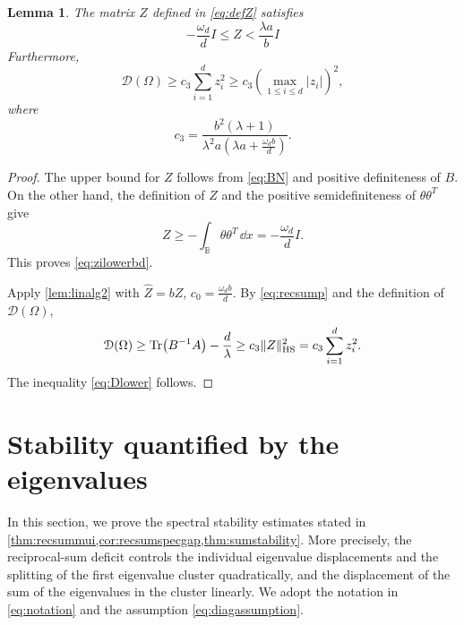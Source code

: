 \documentclass{amsart}
\numberwithin{equation}{section}
\theoremstyle{plain}
\newtheorem{lemma}[theorem]{Lemma}
\theoremstyle{definition}
\theoremstyle{plain}
\theoremstyle{remark}
\numberwithin{figure}{section}
\newcommand{\B}{\mathbb{B}}
\newcommand{\D}{\mathcal{D}(\Omega)}
\begin{document}
\begin{lemma}
    \label{lem:tech}
    The matrix $Z$ defined in \cref{eq:defZ} satisfies
    \begin{equation}
        \label{eq:zilowerbd}
        -\frac{\omega_d}{d}I\leq Z< \frac{\lambda a}{b}I
    \end{equation}
    Furthermore, 
    \begin{equation}
        \label{eq:Dlower}
        \D \geq c_3 \sum_{i=1}^d z_i^2 \geq c_3(\max_{1\leq i\leq d}|z_i|)^2, 
    \end{equation}
    where
    \begin{equation}
        \label{eq:C1}
        c_3=\frac{b^2(\lambda+1)}{\lambda^2 a\left(\lambda a+\frac{\omega_d b}{d}\right)}.
    \end{equation}
\end{lemma}

\begin{proof}
    The upper bound for $Z$ follows from \cref{eq:BN} and positive definiteness of $B$. On the other hand, the definition of $Z$ and the positive semidefiniteness of $\theta\theta^T$ give
    \begin{equation*}
        Z\geq -\int_{\B}\theta\theta^T\,\dd x = -\frac{\omega_d}{d}I.
    \end{equation*}
    This proves \cref{eq:zilowerbd}. 
    
    Apply \cref{lem:linalg2} with $\widehat{Z}=bZ$, $c_0=\frac{\omega_db}{d}$. By \cref{eq:recsump} and the definition of $\D$,
    \[
        \D \geq \Tr(B^{-1}A)-\frac{d}{\lambda} \geq c_3\|Z\|_{\mathrm{HS}}^2 = c_3\sum_{i=1}^d z_i^2.
    \] 
The inequality    \cref{eq:Dlower} follows.
\end{proof}




\section{Stability quantified by the eigenvalues}

In this section, we prove the spectral stability estimates stated in \cref{thm:recsummui,cor:recsumspecgap,thm:sumstability}. More precisely, the reciprocal-sum deficit controls the individual eigenvalue displacements and the splitting of the first eigenvalue cluster quadratically, and the displacement of the sum of the eigenvalues in the cluster linearly. We adopt the notation in \cref{eq:notation} and the assumption \cref{eq:diagassumption}.
\end{document}
